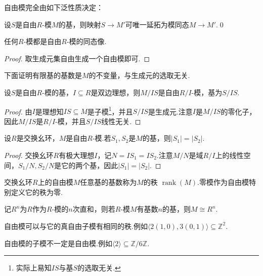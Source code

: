 自由模完全由如下泛性质决定：
\begin{thm}
    设$S$是自由$R$-模$M$的基，则映射$S\to M'$可唯一延拓为模同态$M\to M'$.\qed
\end{thm}
\begin{cor*}
    任何$R$-模都是自由$R$-模的同态像.
\end{cor*}
\begin{proof}
    取生成元集自由生成一个自由模即可.
\end{proof}

下面证明有限基的基数是$M$的不变量，与生成元的选取无关.
\begin{lemma*}
    设$S$是自由$R$-模的基，$I\subseteq R$是双边理想，则$M/IS$是自由$R/I$-模，基为$S/IS$.
\end{lemma*}
\begin{proof}
    由$I$是理想知$IS\subseteq M$是子模\footnote{实际上易知$IS$与基$S$的选取无关.}，并且$S/IS$是生成元.注意$I$是$M/IS$的零化子，因此$M/IS$是$R/I$-模，并且$S/IS$线性无关.
\end{proof}
\begin{prop}
    设$R$是交换幺环，$M$是自由$R$-模.若$S_1,S_2$是$M$的基，则$|S_1|=|S_2|$.
\end{prop}
\begin{proof}
    交换幺环$R$有极大理想$I$，记$N=IS_1=IS_2$.注意$M/N$是域$R/I$上的线性空间，$S_1/N,S_2/N$是它的两个基，因此$|S_1|=|S_2|$.
\end{proof}

交换幺环$R$上的自由模$M$任意基的基数称为$M$的{\heiti 秩} $\operatorname*{rank}(M)$.零模作为自由模特别定义它的秩为零.

记$R^n$为$R$作为$R$-模的$n$次直和，则若$R$-模$M$有基数$n$的基，则$M\cong R^n$.
\begin{remark}
    自由模可以与它的真自由子模有相同的秩.例如$\langle 2(1,0),3(0,1)\rangle\subseteq\mathbb{Z}^2$.

    自由模的子模不一定是自由模.例如$\langle 2\rangle\subseteq\mathbb{Z}/6\mathbb{Z}$.
\end{remark}


